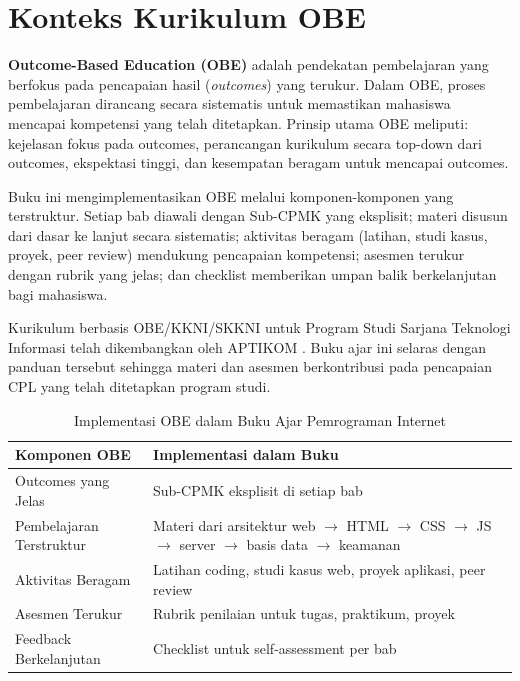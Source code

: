 \section{Konteks Kurikulum OBE}

\textbf{Outcome-Based Education (OBE)} adalah pendekatan pembelajaran yang berfokus pada pencapaian hasil (\textit{outcomes}) yang terukur. Dalam OBE, proses pembelajaran dirancang secara sistematis untuk memastikan mahasiswa mencapai kompetensi yang telah ditetapkan. Prinsip utama OBE meliputi: kejelasan fokus pada outcomes, perancangan kurikulum secara top-down dari outcomes, ekspektasi tinggi, dan kesempatan beragam untuk mencapai outcomes.

Buku ini mengimplementasikan OBE melalui komponen-komponen yang terstruktur. Setiap bab diawali dengan Sub-CPMK yang eksplisit; materi disusun dari dasar ke lanjut secara sistematis; aktivitas beragam (latihan, studi kasus, proyek, peer review) mendukung pencapaian kompetensi; asesmen terukur dengan rubrik yang jelas; dan checklist memberikan umpan balik berkelanjutan bagi mahasiswa.

Kurikulum berbasis OBE/KKNI/SKKNI untuk Program Studi Sarjana Teknologi Informasi telah dikembangkan oleh APTIKOM \cite{aptikom}. Buku ajar ini selaras dengan panduan tersebut sehingga materi dan asesmen berkontribusi pada pencapaian CPL yang telah ditetapkan program studi.

\begin{table}[h]
\centering
\small
\begin{tabular}{|l|p{8cm}|}
\hline
\textbf{Komponen OBE} & \textbf{Implementasi dalam Buku} \\
\hline
Outcomes yang Jelas & Sub-CPMK eksplisit di setiap bab \\
\hline
Pembelajaran Terstruktur & Materi dari arsitektur web $\rightarrow$ HTML $\rightarrow$ CSS $\rightarrow$ JS $\rightarrow$ server $\rightarrow$ basis data $\rightarrow$ keamanan \\
\hline
Aktivitas Beragam & Latihan coding, studi kasus web, proyek aplikasi, peer review \\
\hline
Asesmen Terukur & Rubrik penilaian untuk tugas, praktikum, proyek \\
\hline
Feedback Berkelanjutan & Checklist untuk self-assessment per bab \\
\hline
\end{tabular}
\caption{Implementasi OBE dalam Buku Ajar Pemrograman Internet}
\end{table}

